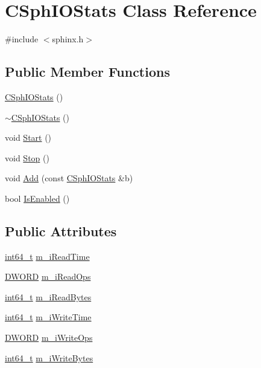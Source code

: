 \hypertarget{classCSphIOStats}{\section{C\-Sph\-I\-O\-Stats Class Reference}
\label{classCSphIOStats}
}


{\ttfamily \#include $<$sphinx.\-h$>$}

\subsection*{Public Member Functions}
\begin{DoxyCompactItemize}
\item 
\hyperlink{classCSphIOStats_abdff9cc9563f4cc3aea256a74e2ff6d2}{C\-Sph\-I\-O\-Stats} ()
\item 
\hyperlink{classCSphIOStats_a0901f2b60f739828070fd414189fcaa6}{$\sim$\-C\-Sph\-I\-O\-Stats} ()
\item 
void \hyperlink{classCSphIOStats_a2ecfa522d6762df1800a5f864f61fcda}{Start} ()
\item 
void \hyperlink{classCSphIOStats_a82eb8047b1bf5c7e67faa91c8201f323}{Stop} ()
\item 
void \hyperlink{classCSphIOStats_a9f7c347e757c9f668c0fb4369f2009b0}{Add} (const \hyperlink{classCSphIOStats}{C\-Sph\-I\-O\-Stats} \&b)
\item 
bool \hyperlink{classCSphIOStats_aa182a5944a0e35047e6b470e1196d9e4}{Is\-Enabled} ()
\end{DoxyCompactItemize}
\subsection*{Public Attributes}
\begin{DoxyCompactItemize}
\item 
\hyperlink{sphinxstd_8h_a996e72f71b11a5bb8b3b7b6936b1516d}{int64\-\_\-t} \hyperlink{classCSphIOStats_a42836d95e39a1a5d04ebed5be144ac1a}{m\-\_\-i\-Read\-Time}
\item 
\hyperlink{sphinxstd_8h_a798af1e30bc65f319c1a246cecf59e39}{D\-W\-O\-R\-D} \hyperlink{classCSphIOStats_a2ad9c72a148c73705e2ece50b63ffa09}{m\-\_\-i\-Read\-Ops}
\item 
\hyperlink{sphinxstd_8h_a996e72f71b11a5bb8b3b7b6936b1516d}{int64\-\_\-t} \hyperlink{classCSphIOStats_aee077caf4d4d953791b5ed528c46053e}{m\-\_\-i\-Read\-Bytes}
\item 
\hyperlink{sphinxstd_8h_a996e72f71b11a5bb8b3b7b6936b1516d}{int64\-\_\-t} \hyperlink{classCSphIOStats_a3617d74b4ad57e3310aab3b488b8482d}{m\-\_\-i\-Write\-Time}
\item 
\hyperlink{sphinxstd_8h_a798af1e30bc65f319c1a246cecf59e39}{D\-W\-O\-R\-D} \hyperlink{classCSphIOStats_a96e6898d2120e25d31a5fe8bb86864f7}{m\-\_\-i\-Write\-Ops}
\item 
\hyperlink{sphinxstd_8h_a996e72f71b11a5bb8b3b7b6936b1516d}{int64\-\_\-t} \hyperlink{classCSphIOStats_a392b3667765a3b3329bb8e3673a192e1}{m\-\_\-i\-Write\-Bytes}
\end{DoxyCompactItemize}
